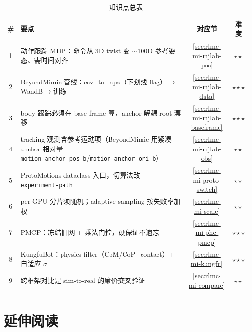 \begin{table}[H]
\centering
\small
\caption{知识点总表}
\label{tab:rlmc-mi-points}
\begin{tabular}{@{}clcc@{}}
\toprule
\# & 要点 & 对应节 & 难度 \\
\midrule
1 & 动作跟踪 MDP：命令从 3D twist 变 $\sim$100D 参考姿态、需时间对齐 & \cref{sec:rlmc-mi-mjlab-pos} & $\star\star$ \\
2 & BeyondMimic 管线：csv\_to\_npz（下划线 flag）$\to$WandB$\to$训练 & \cref{sec:rlmc-mi-mjlab-data} & $\star\star\star$ \\
3 & body 跟踪必须在 base frame 算，anchor 解耦 root 漂移 & \cref{sec:rlmc-mi-mjlab-baseframe} & $\star\star\star$ \\
4 & tracking 观测含参考运动项（BeyondMimic 用紧凑 anchor 相对量 \verb|motion_anchor_pos_b|/\verb|motion_anchor_ori_b|） & \cref{sec:rlmc-mi-mjlab-obs} & $\star\star$ \\
5 & ProtoMotions dataclass 入口，切算法改 \texttt{--experiment-path} & \cref{sec:rlmc-mi-proto-switch} & $\star\star$ \\
6 & per-GPU 分片须随机；adaptive sampling 按失败率加权 & \cref{sec:rlmc-mi-scale} & $\star\star$ \\
7 & PMCP：冻结旧网 + 乘法门控，硬保证不遗忘 & \cref{sec:rlmc-mi-phc-pmcp} & $\star\star\star$ \\
8 & KungfuBot：physics filter（CoM/CoP+contact）+ 自适应 $\sigma$ & \cref{sec:rlmc-mi-kungfu} & $\star\star\star$ \\
9 & 跨框架对比是 sim-to-real 的廉价交叉验证 & \cref{sec:rlmc-mi-compare} & $\star\star$ \\
\bottomrule
\end{tabular}
\end{table}

\section*{延伸阅读}
\label{sec:rlmc-mi-further}

